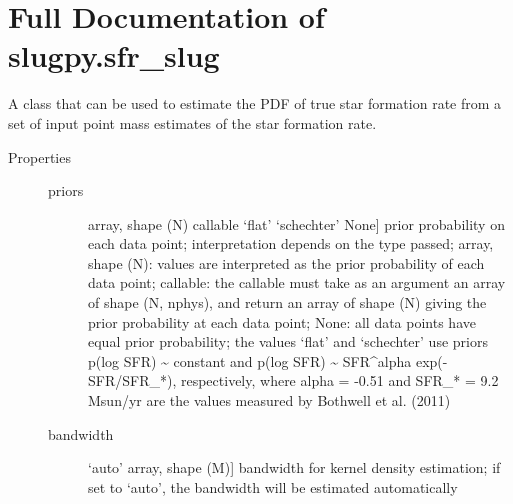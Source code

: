 \documentclass[letterpaper,10pt,english]{sphinxmanual}
\begin{document}
\section{Full Documentation of slugpy.sfr\_slug}
\label{sfr_slug:sec-sfr-slug-full}\label{sfr_slug:full-documentation-of-slugpy-sfr-slug}

\begin{fulllineitems}
\label{sfr_slug:slugpy.sfr_slug.sfr_slug}
A class that can be used to estimate the PDF of true star
formation rate from a set of input point mass estimates of the
star formation rate.
\begin{description}
\item[{Properties}] \leavevmode\begin{description}
\item[{priors}] \leavevmode{[}array, shape (N) \textbar{} callable \textbar{} `flat' \textbar{} `schechter' \textbar{} None{]}
prior probability on each data point; interpretation
depends on the type passed; array, shape (N): values are
interpreted as the prior probability of each data point;
callable: the callable must take as an argument an array
of shape (N, nphys), and return an array of shape (N)
giving the prior probability at each data point; None:
all data points have equal prior probability; the values
`flat' and `schechter' use priors p(log SFR) \textasciitilde{} constant and
p(log SFR) \textasciitilde{} SFR\textasciicircum{}alpha exp(-SFR/SFR\_*), respectively, where
alpha = -0.51 and SFR\_* = 9.2 Msun/yr are the values
measured by Bothwell et al. (2011)

\item[{bandwidth}] \leavevmode{[}`auto' \textbar{} array, shape (M){]}
bandwidth for kernel density estimation; if set to
`auto', the bandwidth will be estimated automatically

\end{description}

\end{description}

\begin{fulllineitems}
\label{sfr_slug:slugpy.sfr_slug.sfr_slug.__init__}~\begin{quote}


\end{quote}
\end{fulllineitems}
\end{fulllineitems}
\end{document}
